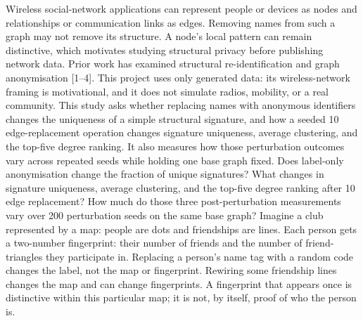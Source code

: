 {}
\markdownRendererSectionEnd \markdownRendererSectionBegin
{}\markdownRendererInterblockSeparator
{}Wireless social-network applications can represent people or devices as nodes and relationships or communication links as edges. Removing names from such a graph may not remove its structure. A node's local pattern can remain distinctive, which motivates studying structural privacy before publishing network data. Prior work has examined structural re-identification and graph anonymisation [1–4]. This project uses only generated data: its wireless-network framing is motivational, and it does not simulate radios, mobility, or a real community.\markdownRendererInterblockSeparator
{}\markdownRendererSectionBegin
{}\markdownRendererInterblockSeparator
{}This study asks whether replacing names with anonymous identifiers changes the uniqueness of a simple structural signature, and how a seeded 10\markdownRendererPercentSign{} edge-replacement operation changes signature uniqueness, average clustering, and the top-five degree ranking. It also measures how those perturbation outcomes vary across repeated seeds while holding one base graph fixed.\markdownRendererInterblockSeparator
{}
\markdownRendererSectionEnd \markdownRendererSectionBegin
{}\markdownRendererInterblockSeparator
{}\markdownRendererOlBeginTight
{}Does label-only anonymisation change the fraction of unique  signatures?\markdownRendererOlItemEnd 
{}What changes in signature uniqueness, average clustering, and the top-five degree ranking after 10\markdownRendererPercentSign{} edge replacement?\markdownRendererOlItemEnd 
{}How much do those three post-perturbation measurements vary over 200 perturbation seeds on the same base graph?\markdownRendererOlItemEnd 
\markdownRendererOlEndTight \markdownRendererInterblockSeparator
{}
\markdownRendererSectionEnd 
\markdownRendererSectionEnd \markdownRendererSectionBegin
{}\markdownRendererInterblockSeparator
{}\markdownRendererSectionBegin
{}\markdownRendererInterblockSeparator
{}Imagine a club represented by a map: people are dots and friendships are lines. Each person gets a two-number fingerprint: their number of friends and the number of friend-triangles they participate in. Replacing a person's name tag with a random code changes the label, not the map or fingerprint. Rewiring some friendship lines changes the map and can change fingerprints. A fingerprint that appears once is distinctive within this particular map; it is not, by itself, proof of who the person is.\markdownRendererInterblockSeparator
